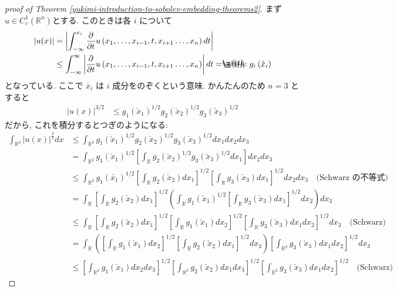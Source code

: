 \documentclass[openany, a4paper, oneside]{book}
\makeatletter
\newcommand*{\eqdef}{=\mathrel{\hbox to 0pt{%
\raisebox{0.3ex}{$\m@th\cdot$}}%
\raisebox{-0.3ex}{$\m@th\cdot$}}%
}
\theoremstyle{break}
\theoremstyle{breakdefn}
\newcommand{\abs}[1]{\left|#1\right|}
\newcommand{\rbk}[1]{\left (#1\right)}
\newcommand{\sqbk}[1]{\left[#1\right]}
\newcommand{\bbR}{\mathbb{R}}
\newcommand{\bbRn}{\mathbb{R}^n}
\makeatother
\begin{document}
\begin{proof}[proof of Theorem \ref{yukimi-introduction-to-sobolev-embedding-theorems2}]
まず$u \in C_c^1 (\bbRn)$とする.
このときは各 $i$ について
\begin{align}\label{yukimi-introduction-to-sobolev-embedding-theorems3}
 \abs{u(x)}
 &=
 \abs{\int_{-\infty}^{x_i} \frac{\partial}{\partial t} u \rbk{x_1, \dots , x_{i-1}, t, x_{i+1} \dots, x_n} dt} \\
 &\le
 \int_{-\infty}^{\infty}
  \abs{\frac{\partial}{\partial t} u \rbk{x_1, \dots , x_{i-1}, t, x_{i+1} \dots, x_n}} dt
  \eqdef g_i \rbk{\check{x}_i}
\end{align}
となっている.
ここで $\check{x_i}$ は $i$ 成分をのぞくという意味.
かんたんのため $n = 3$ とすると
\begin{align}
 \abs{u(x)}^{3/2}
 &\leq
 g_1(\check{x}_1)^{1/2} g_2(\check{x}_2)^{1/2} g_3(\check{x}_3)^{1/2}
\end{align}
だから, これを積分するとつぎのようになる:
\begin{align}
 \int_{\bbR^3} \abs{u(x)}^{\frac{3}{2}}dx
 &\le
 \int_{\bbR^3} g_1(\check{x}_1)^{1/2} g_2(\check{x}_2)^{1/2} g_3 (\check{x}_3)^{1/2} dx_1 dx_2 dx_3 \\
 &=
 \int_{\mathbb{R}^2} g_1(\check{x}_1)^{1/2}
 \sqbk{\int_{\bbR} g_2(\check{x}_2)^{1/2} g_3(\check{x}_3)^{1/2} dx_1} dx_2 dx_3 \\
 &\le
 \int_{\bbR^2} g_1(\check{x_1})^{1/2}
  \sqbk{\int_{\bbR} g_2 (\check{x}_2) dx_1}^{1/2}
  \sqbk{\int_{\mathbb{R}} g_3 (\check{x}_3) dx_1}^{1/2} dx_2 dx_3 \quad \text{(Schwarz の不等式)} \\
 &=
 \int_{\bbR} \sqbk{\int_{\mathbb{R}} g_2(\check{x}_2) dx_1}^{1/2}
  \rbk{\int_{\mathbb{R}}g_1 (\check{x}_1)^{1/2} \sqbk{\int_{\bbR} g_3(\check{x}_3) dx_1}^{1/2} dx_2} dx_3 \\
 &\le
 \int_{\bbR} \sqbk{\int_{\mathbb{R}} g_2(\check{x}_2) dx_1}^{1/2}
  \sqbk{\int_{\bbR} g_1(\check{x}_1) dx_2}^{1/2}
  \sqbk{\int_{\bbR} g_3(\check{x}_3) dx_1 dx_2}^{1/2} dx_3 \quad \text{(Schwarz)} \\
 &=
 \int_{\bbR}
  \rbk{\sqbk{\int_{\bbR} g_1(\check{x}_1) dx_2}^{1/2} \sqbk{\int_{\bbR} g_2(\check{x}_2) dx_1}^{1/2} dx_3}
  \sqbk{\int_{\bbR^2} g_3(\check{x}_3) dx_1 dx_2}^{1/2} dx_3 \\
 &\le
 \sqbk{\int_{\bbR^2} g_1(\check{x}_1) dx_2 dx_3}^{1/2}
  \sqbk{\int_{\bbR^2} g_2(\check{x}_2) dx_1 dx_3}^{1/2}
  \sqbk{\int_{\bbR^2} g_3(\check{x}_3) dx_1 dx_2}^{1/2}
  \quad \text{(Schwarz)}
\end{align}

\end{proof}
\end{document}
